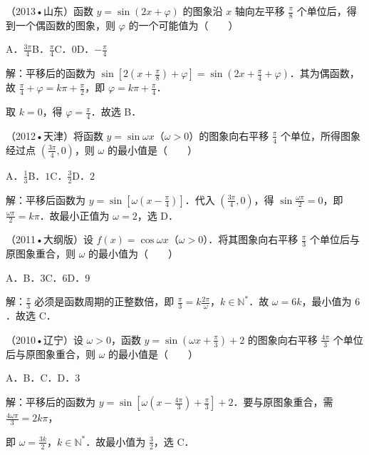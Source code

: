 \begin{question}
（2013•山东）函数 $y=\sin(2x+\varphi)$ 的图象沿 $x$ 轴向左平移 $\frac{\pi}{8}$ 个单位后，得到一个偶函数的图象，则 $\varphi$ 的一个可能值为（　　）\par
A．$\frac{3\pi}{4}$\qquad B．$\frac{\pi}{4}$\qquad C．$0$\qquad D．$-\frac{\pi}{4}$\par
\begin{solution}
解：平移后的函数为 $\sin[2(x+\frac{\pi}{8})+\varphi]=\sin(2x+\frac{\pi}{4}+\varphi)$．其为偶函数，故 $\frac{\pi}{4}+\varphi=k\pi+\frac{\pi}{2}$，即 $\varphi=k\pi+\frac{\pi}{4}$．\par
取 $k=0$，得 $\varphi=\frac{\pi}{4}$．故选 B．\par
\end{solution}
\end{question}

\begin{question}
（2012•天津）将函数 $y=\sin\omega x$（$\omega>0$）的图象向右平移 $\frac{\pi}{4}$ 个单位，所得图象经过点 $(\frac{3\pi}{4},0)$，则 $\omega$ 的最小值是（　　）\par
A．$\frac13$\qquad B．$1$\qquad C．$\frac32$\qquad D．$2$\par
\begin{solution}
解：平移后函数为 $y=\sin[\omega(x-\frac{\pi}{4})]$．代入 $(\frac{3\pi}{4},0)$，得 $\sin\frac{\omega\pi}{2}=0$，即 $\frac{\omega\pi}{2}=k\pi$．故最小正值为 $\omega=2$，选 D．\par
\end{solution}
\end{question}

\begin{question}
（2011•大纲版）设 $f(x)=\cos\omega x$（$\omega>0$）．将其图象向右平移 $\frac{\pi}{3}$ 个单位后与原图象重合，则 $\omega$ 的最小值为（　　）\par
A．\qquad{}B．3\qquad{}C．6\qquad{}D．9\par
\begin{solution}
解：$\frac{\pi}{3}$ 必须是函数周期的正整数倍，即 $\frac{\pi}{3}=k\frac{2\pi}{\omega}$，$k\in\mathbb N^*$．故 $\omega=6k$，最小值为 $6$．故选 C．\par
\end{solution}
\end{question}

\begin{question}
（2010•辽宁）设 $\omega>0$，函数 $y=\sin(\omega x+\frac{\pi}{3})+2$ 的图象向右平移 $\frac{4\pi}{3}$ 个单位后与原图象重合，则 $\omega$ 的最小值是（　　）\par
A．\qquad{}B．\qquad{}C．\qquad{}D．3\par
\begin{solution}
解：平移后的函数为 $y=\sin[\omega(x-\frac{4\pi}{3})+\frac{\pi}{3}]+2$．要与原图象重合，需 $\frac{4\omega\pi}{3}=2k\pi$，\par
即 $\omega=\frac{3k}{2}$，$k\in\mathbb N^*$．故最小值为 $\frac32$，选 C．\par
\end{solution}
\end{question}

